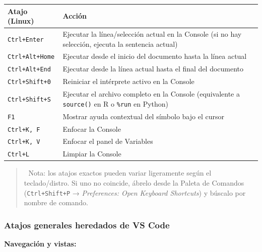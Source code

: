 \documentclass[
  doc,
  floatsintext,
  longtable,
  a4paper,
  nolmodern,
  notxfonts,
  notimes,
  12pt,
  colorlinks=true,linkcolor=blue,citecolor=blue,urlcolor=blue]{apa7}
\newcounter{none} %
\begin{document}
{\def\LTcaptype{none} %
\begin{longtable}[]{@{}
  >{\raggedright\arraybackslash}p{}
  >{\raggedright\arraybackslash}p{}@{}}
\toprule\noalign{}
\begin{minipage}[b]{\linewidth}\raggedright
Atajo (Linux)
\end{minipage} & \begin{minipage}[b]{\linewidth}\raggedright
Acción
\end{minipage} \\
\midrule\noalign{}
\endhead
\bottomrule\noalign{}
\endlastfoot
\texttt{Ctrl+Enter} & Ejecutar la línea/selección actual en la Console
(si no hay selección, ejecuta la sentencia actual) \\
\texttt{Ctrl+Alt+Home} & Ejecutar desde el inicio del documento hasta la
línea actual \\
\texttt{Ctrl+Alt+End} & Ejecutar desde la línea actual hasta el final
del documento \\
\texttt{Ctrl+Shift+0} & Reiniciar el intérprete activo en la Console \\
\texttt{Ctrl+Shift+S} & Ejecutar el archivo completo en la Console
(equivalente a \texttt{source()} en R o \texttt{\%run} en Python) \\
\texttt{F1} & Mostrar ayuda contextual del símbolo bajo el cursor \\
\texttt{Ctrl+K,\ F} & Enfocar la Console \\
\texttt{Ctrl+K,\ V} & Enfocar el panel de Variables \\
\texttt{Ctrl+L} & Limpiar la Console \\
\end{longtable}
}

\begin{quote}
📝 Nota: los atajos exactos pueden variar ligeramente según el
teclado/distro. Si uno no coincide, ábrelo desde la Paleta de Comandos
(\texttt{Ctrl+Shift+P} → \emph{Preferences: Open Keyboard Shortcuts}) y
búscalo por nombre de comando.
\end{quote}

\subsubsection{Atajos generales heredados de VS
Code}\label{atajos-generales-heredados-de-vs-code}

\textbf{Navegación y vistas:}
\end{document}
